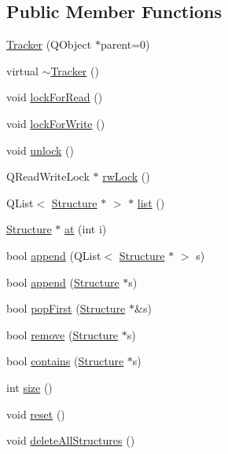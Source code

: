 \subsection*{Public Member Functions}
\begin{DoxyCompactItemize}
\item 
\hyperlink{classGlobalSearch_1_1Tracker_ae61188a8f66c57cc303a823da6130f25}{Tracker} (Q\-Object $\ast$parent=0)
\item 
virtual \hyperlink{classGlobalSearch_1_1Tracker_a231c0a58d7023188e0b9118924fac506}{$\sim$\-Tracker} ()
\item 
void \hyperlink{classGlobalSearch_1_1Tracker_afa0bbd85ec04527c7919a29746e235e4}{lock\-For\-Read} ()
\item 
void \hyperlink{classGlobalSearch_1_1Tracker_aba8064ec469694aa7207b734ac075fad}{lock\-For\-Write} ()
\item 
void \hyperlink{classGlobalSearch_1_1Tracker_a3c30e04b28dd39ddeff887d3bf4e812a}{unlock} ()
\item 
Q\-Read\-Write\-Lock $\ast$ \hyperlink{classGlobalSearch_1_1Tracker_a4aa19e3357f6803957c5646c4bb8f530}{rw\-Lock} ()
\item 
Q\-List$<$ \hyperlink{classGlobalSearch_1_1Structure}{Structure} $\ast$ $>$ $\ast$ \hyperlink{classGlobalSearch_1_1Tracker_a2d8fc282ef5d400a48f5afb931eeba8b}{list} ()
\item 
\hyperlink{classGlobalSearch_1_1Structure}{Structure} $\ast$ \hyperlink{classGlobalSearch_1_1Tracker_ab1457df5dea634a1f9b482cab0c8edb0}{at} (int i)
\item 
bool \hyperlink{classGlobalSearch_1_1Tracker_aebafa2ceea4e665f2660917eb18eb4b5}{append} (Q\-List$<$ \hyperlink{classGlobalSearch_1_1Structure}{Structure} $\ast$ $>$ s)
\item 
bool \hyperlink{classGlobalSearch_1_1Tracker_a1b1705061e58e92e1650e91cb44a07f6}{append} (\hyperlink{classGlobalSearch_1_1Structure}{Structure} $\ast$s)
\item 
bool \hyperlink{classGlobalSearch_1_1Tracker_a7e022f8bd6943c5eb0651f81ce369793}{pop\-First} (\hyperlink{classGlobalSearch_1_1Structure}{Structure} $\ast$\&s)
\item 
bool \hyperlink{classGlobalSearch_1_1Tracker_ad8a31bd3a5185e88157b3a61fdf48a27}{remove} (\hyperlink{classGlobalSearch_1_1Structure}{Structure} $\ast$s)
\item 
bool \hyperlink{classGlobalSearch_1_1Tracker_aa6feecde63a4483355a3672e1dd137dc}{contains} (\hyperlink{classGlobalSearch_1_1Structure}{Structure} $\ast$s)
\item 
int \hyperlink{classGlobalSearch_1_1Tracker_a3670df88ce17cde7984de8cf72ed189b}{size} ()
\item 
void \hyperlink{classGlobalSearch_1_1Tracker_a585a3720623c0df6f793e7b1b8fc586b}{reset} ()
\item 
void \hyperlink{classGlobalSearch_1_1Tracker_a29171b414ff3092c73113565e838bcc1}{delete\-All\-Structures} ()
\end{DoxyCompactItemize}



